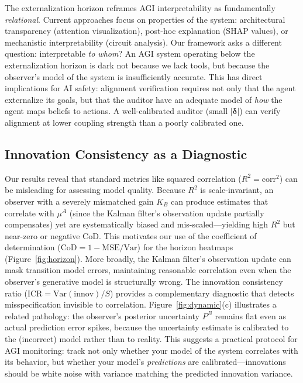 \documentclass[runningheads]{llncs}
\begin{document}
The externalization horizon reframes AGI interpretability as fundamentally \emph{relational}. Current approaches focus on properties of the system: architectural transparency (attention visualization), post-hoc explanation (SHAP values), or mechanistic interpretability (circuit analysis). Our framework asks a different question: interpretable \emph{to whom}? An AGI system operating below the externalization horizon is dark not because we lack tools, but because the observer's model of the system is insufficiently accurate. This has direct implications for AI safety: alignment verification requires not only that the agent externalize its goals, but that the auditor have an adequate model of \emph{how} the agent maps beliefs to actions. A well-calibrated auditor (small $|\boldsymbol{\delta}|$) can verify alignment at lower coupling strength than a poorly calibrated one.

\subsection{Innovation Consistency as a Diagnostic}

Our results reveal that standard metrics like squared correlation ($R^2 = \mathrm{corr}^2$) can be misleading for assessing model quality. Because $R^2$ is scale-invariant, an observer with a severely mismatched gain $K_B$ can produce estimates that correlate with $\mu^A$ (since the Kalman filter's observation update partially compensates) yet are systematically biased and mis-scaled---yielding high $R^2$ but near-zero or negative CoD. This motivates our use of the coefficient of determination ($\mathrm{CoD} = 1 - \mathrm{MSE}/\mathrm{Var}$) for the horizon heatmaps (Figure~\ref{fig:horizon}). More broadly, the Kalman filter's observation update can mask transition model errors, maintaining reasonable correlation even when the observer's generative model is structurally wrong. The innovation consistency ratio ($\mathrm{ICR} = \mathrm{Var}(\text{innov})/S$) provides a complementary diagnostic that detects misspecification invisible to correlation. Figure~\ref{fig:dynamic}(c) illustrates a related pathology: the observer's posterior uncertainty $P^B$ remains flat even as actual prediction error spikes, because the uncertainty estimate is calibrated to the (incorrect) model rather than to reality. This suggests a practical protocol for AGI monitoring: track not only whether your model of the system correlates with its behavior, but whether your model's \emph{predictions} are calibrated---innovations should be white noise with variance matching the predicted innovation variance.
\end{document}
